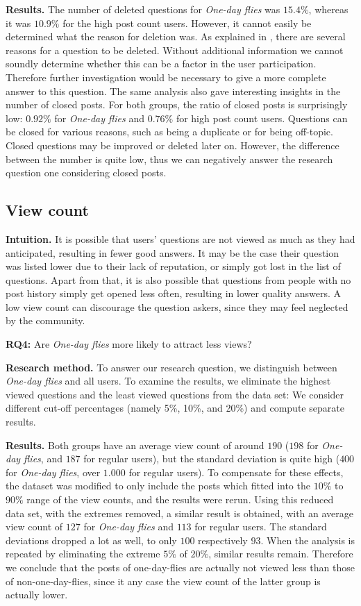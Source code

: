 \documentclass[conference]{IEEEtran}
\newcommand\odf{\emph{One-day flies}\xspace}
\begin{document}
\textbf{Results.} The number of deleted questions for \odf was $15.4\%$,
whereas it was $10.9\%$ for the high post count users. However, it cannot
easily be determined what the reason for deletion was. As explained in
\cite{correa2014chaff}, there are several reasons for a question to be deleted.
Without additional information we cannot soundly determine whether this can be
a factor in the user participation. Therefore further investigation would be
necessary to give a more complete answer to this question.
The same analysis also gave interesting insights in the number of closed posts.
For both groups, the ratio of closed posts is surprisingly low: $0.92\%$ for
\odf and $0.76\%$ for high post count users. Questions can be closed for
various reasons, such as being a duplicate or for being off-topic. Closed
questions may be improved or deleted later on. However, the difference between
the number is quite low, thus we can negatively answer the research question
one considering closed posts. 



\subsection{View count}

\textbf{Intuition.} It is possible that users' questions are not
viewed as much as they had anticipated, resulting in fewer good answers. It may
be the case their question was listed lower due to their lack of reputation, or
simply got lost in the list of questions. Apart from that, it is also possible
that questions from people with no post history simply get opened less often,
resulting in lower quality answers. A low view count can discourage the 
question askers, since they may feel neglected by the community. 
 
\textbf{RQ4:} Are \odf more likely to attract less views? 
 
\textbf{Research method.} To answer our research question, we distinguish
between \odf and all users. To examine the results,
we eliminate the highest viewed questions and the least
viewed questions  from the data set: We consider different cut-off percentages
(namely 5\%, 10\%, and 20\%) and compute separate results. 
 
\textbf{Results.} Both groups have an average view count of around $190$ ($198$
for \odf, and $187$ for regular users), but the standard deviation is quite
high ($400$ for \odf, over $1.000$ for regular users). To compensate for these
effects, the dataset was modified to only include the posts which fitted into
the $10\%$ to $90\%$ range of the view counts, and the results were rerun.
Using this reduced data set, with the extremes removed, a similar result is
obtained, with an average view count of $127$ for \odf and $113$ for regular
users. The standard deviations dropped a lot as well, to only $100$
respectively $93$. When the analysis is repeated by eliminating the extreme
$5\%$ of $20\%$, similar results remain. Therefore we conclude that the posts
of one-day-flies are actually not viewed less than those of non-one-day-flies,
since it any case the view count of the latter group is actually lower. 
\end{document}
